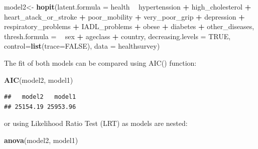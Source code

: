 \documentclass[]{article}
\newenvironment{Shaded}{\begin{snugshade}}{\end{snugshade}}
\newcommand{\DataTypeTok}[1]{\textcolor[rgb]{0.13,0.29,0.53}{#1}}
\newcommand{\KeywordTok}[1]{\textcolor[rgb]{0.13,0.29,0.53}{\textbf{#1}}}
\newcommand{\NormalTok}[1]{#1}
\newcommand{\OperatorTok}[1]{\textcolor[rgb]{0.81,0.36,0.00}{\textbf{#1}}}
\newcommand{\OtherTok}[1]{\textcolor[rgb]{0.56,0.35,0.01}{#1}}
\newcommand{\StringTok}[1]{\textcolor[rgb]{0.31,0.60,0.02}{#1}}
\begin{document}
\begin{Shaded}
\begin{Highlighting}[]
\NormalTok{model2<-}\StringTok{ }\KeywordTok{hopit}\NormalTok{(}\DataTypeTok{latent.formula =}\NormalTok{ health }\OperatorTok{~}\StringTok{ }\NormalTok{hypertenssion }\OperatorTok{+}\StringTok{ }\NormalTok{high_cholesterol }\OperatorTok{+}\StringTok{ }
\StringTok{                             }\NormalTok{heart_atack_or_stroke }\OperatorTok{+}\StringTok{ }\NormalTok{poor_mobility }\OperatorTok{+}\StringTok{ }
\StringTok{                             }\NormalTok{very_poor_grip }\OperatorTok{+}\StringTok{ }\NormalTok{depression }\OperatorTok{+}\StringTok{ }\NormalTok{respiratory_problems }\OperatorTok{+}\StringTok{ }
\StringTok{                             }\NormalTok{IADL_problems }\OperatorTok{+}\StringTok{ }\NormalTok{obese }\OperatorTok{+}\StringTok{ }\NormalTok{diabetes }\OperatorTok{+}\StringTok{ }\NormalTok{other_diseases, }
               \DataTypeTok{thresh.formula =} \OperatorTok{~}\StringTok{ }\NormalTok{sex }\OperatorTok{+}\StringTok{ }\NormalTok{ageclass }\OperatorTok{+}\StringTok{ }\NormalTok{country,}
               \DataTypeTok{decreasing.levels =} \OtherTok{TRUE}\NormalTok{,}
               \DataTypeTok{control=}\KeywordTok{list}\NormalTok{(}\DataTypeTok{trace=}\OtherTok{FALSE}\NormalTok{),}
               \DataTypeTok{data =}\NormalTok{ healthsurvey)}
\end{Highlighting}
\end{Shaded}

The fit of both models can be compared using AIC() function:

\begin{Shaded}
\begin{Highlighting}[]
\KeywordTok{AIC}\NormalTok{(model2, model1)}
\end{Highlighting}
\end{Shaded}

\begin{verbatim}
##   model2   model1 
## 25154.19 25953.96
\end{verbatim}

or using Likelihood Ratio Test (LRT) as models are nested:

\begin{Shaded}
\begin{Highlighting}[]
\KeywordTok{anova}\NormalTok{(model2, model1)}
\end{Highlighting}
\end{Shaded}
\end{document}
